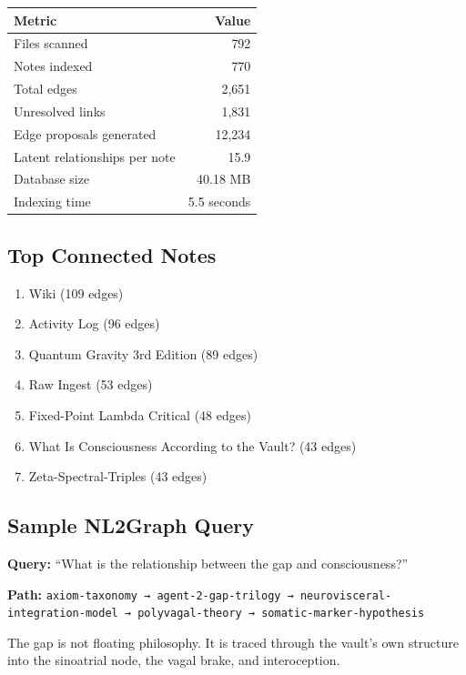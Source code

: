 \documentclass[12pt,a4paper]{article}
\begin{document}
\begin{center}
\begin{tabular}{lr}
\textbf{Metric} & \textbf{Value} \\
\hline
Files scanned & 792 \\
Notes indexed & 770 \\
Total edges & 2,651 \\
Unresolved links & 1,831 \\
Edge proposals generated & 12,234 \\
Latent relationships per note & 15.9 \\
Database size & 40.18 MB \\
Indexing time & 5.5 seconds \\
\end{tabular}
\end{center}

\subsection{Top Connected Notes}

\begin{enumerate}[nosep]
  \item Wiki (109 edges)
  \item Activity Log (96 edges)
  \item Quantum Gravity 3rd Edition (89 edges)
  \item Raw Ingest (53 edges)
  \item Fixed-Point Lambda Critical (48 edges)
  \item What Is Consciousness According to the Vault? (43 edges)
  \item Zeta-Spectral-Triples (43 edges)
\end{enumerate}

\subsection{Sample NL2Graph Query}

\textbf{Query:} ``What is the relationship between the gap and
consciousness?''

\textbf{Path:} \texttt{axiom-taxonomy → agent-2-gap-trilogy →
neurovisceral-integration-model → polyvagal-theory →
somatic-marker-hypothesis}

The gap is not floating philosophy. It is traced through the vault's
own structure into the sinoatrial node, the vagal brake, and
interoception.

\clearpage
\end{document}
